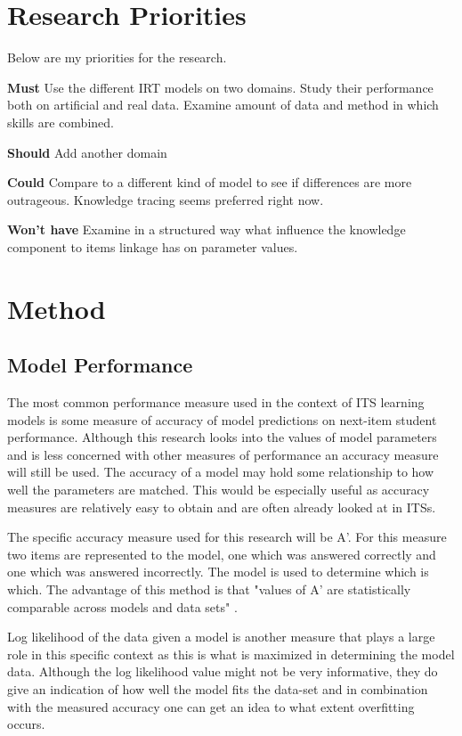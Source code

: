 \documentclass{article}
\begin{document}
\section{Research Priorities}
Below are my priorities for the research.

{\bf Must} Use the different IRT models on two domains. Study their performance both on artificial and real data. Examine amount of data and method in which skills are combined.

{\bf Should} Add another domain

{\bf Could} Compare to a different kind of model to see if differences are more outrageous. Knowledge tracing seems preferred right now.

{\bf Won't have} Examine in a structured way what influence the knowledge component to items linkage has on parameter values.

\section{Method}




\subsection{Model Performance}

\label{sec:perf}
The most common performance measure used in the context of ITS learning models is some measure of accuracy of model predictions on next-item student performance. Although this research looks into the values of model parameters and is less concerned with other measures of performance an accuracy measure will still be used. The accuracy of a model may hold some relationship to how well the parameters are matched. This would be especially useful as accuracy measures are relatively easy to obtain and are often already looked at in ITSs.

The specific accuracy measure used for this research will be A'. For this measure two items are represented to the model, one which was answered correctly and one which was answered incorrectly. The model is used to determine which is which. The advantage of this method is that "values of A' are statistically comparable across models and data sets" \cite{modelreview}.

Log likelihood of the data given a model is another measure that plays a large role in this specific context as this is what is maximized in determining the model data. Although the log likelihood value might not be very informative, they do give an indication of how well the model fits the data-set and in combination with the measured accuracy one can get an idea to what extent overfitting occurs.
\end{document}
